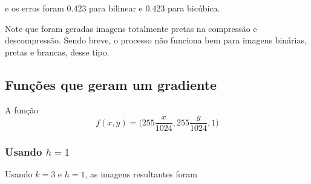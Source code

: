 \documentclass{article}
\begin{document}
e os erros foram 0.423 para bilinear e 0.423 para bicúbica.

Note que foram geradas imagens totalmente pretas na compressão e descompressão.
Sendo breve, o processo não funciona bem para imagens binárias, pretas e brancas,
desse tipo.

\subsection{Funções que geram um gradiente}

A função
\begin{equation}
  f(x,y) = \Biggl( 255 \dfrac{x}{1024} , 255 \dfrac{y}{1024}, 1 \Biggr)
\end{equation}

\subsubsection[Usando h=1]{Usando $h=1$}

Usando $k=3$ e $h=1$, as imagens resultantes foram
\end{document}

